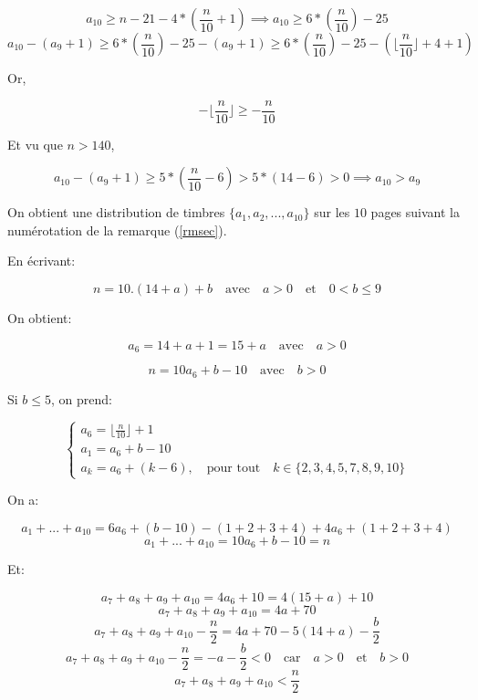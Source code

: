 \documentclass[12pt,a4paper,article]{memoir}
\newcommand{\floor}[1]{\lfloor #1 \rfloor}
\begin{document}
\[a_{10} \geq n - 21 - 4*(\frac{n}{10} + 1) \implies a_{10} \geq 6*(\frac{n}{10}) - 25\]
\[a_{10} - (a_{9} + 1) \geq 6*(\frac{n}{10}) - 25 - (a_{9} + 1) \geq 6*(\frac{n}{10}) - 25 - (\floor{\frac{n}{10}} + 4 + 1) \]

Or,

\[-\floor{\frac{n}{10}} \geq -\frac{n}{10}\]

Et vu que $n > 140$, 

\[a_{10} - (a_{9} + 1) \geq 5*(\frac{n}{10} - 6) > 5*(14 - 6) > 0 \implies a_{10} > a_{9} \]

On obtient une distribution de timbres $\{a_{1}, a_{2}, ..., a_{10}\}$ sur les $10$ pages suivant la numérotation de la remarque (\ref{rmsec}).

\bigskip

En écrivant:

\begin{equation}
n = 10.(14+a) + b \quad \textrm{avec} \quad a > 0 \quad \textrm{et} \quad 0 < b \leq 9
\label{equation-dec-nsup140}
\end{equation}

On obtient:

\begin{equation}
a_{6} = 14 + a + 1 = 15 + a \quad \textrm{avec} \quad a > 0
\label{equation-dec-a6}
\end{equation}

\begin{equation}
n = 10a_{6} + b - 10 \quad \textrm{avec} \quad b > 0
\label{equation-dec-n-a6}
\end{equation}

Si $b \leq 5$, on prend: 

\begin{equation}
\left\{
	\begin{array}{l}
	a_{6} = \floor{\frac{n}{10}} + 1\\
	a_{1} = a_{6} + b - 10\\
	a_{k} = a_{6} + (k - 6), \quad \textrm{pour tout} \quad k \in \{2, 3, 4, 5, 7, 8, 9, 10\}
	\end{array}
\right.
\label{equation-def-exp-distsup140-binf5}
\end{equation}

On a:

\[a_{1} + ... + a_{10} = 6a_{6} + (b - 10) - (1+ 2 + 3 + 4) + 4a_{6} + (1 + 2 + 3 + 4) \]
\[a_{1} + ... + a_{10} = 10a_{6} + b - 10 = n \]

Et:

\[a_{7} + a_{8} + a_{9} + a_{10} = 4a_{6} + 10 = 4(15 + a) + 10 \]
\[a_{7} + a_{8} + a_{9} + a_{10} = 4a + 70\]
\[a_{7} + a_{8} + a_{9} + a_{10} - \frac{n}{2} = 4a + 70 - 5(14 + a) - \frac{b}{2} \]
\[a_{7} + a_{8} + a_{9} + a_{10} - \frac{n}{2} = - a - \frac{b}{2} < 0 \quad \textrm{car} \quad a > 0 \quad \textrm{et} \quad b > 0 \]
\[a_{7} + a_{8} + a_{9} + a_{10} < \frac{n}{2}\]
\end{document}
